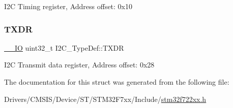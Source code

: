 I2C Timing register, Address offset\+: 0x10 \mbox{\label{struct_i2_c___type_def_ad243ba45c86b31cb271ccfc09c920628}} 
\subsubsection{\texorpdfstring{TXDR}{TXDR}}
{\footnotesize\ttfamily \mbox{\hyperlink{core__sc300_8h_aec43007d9998a0a0e01faede4133d6be}{\+\_\+\+\_\+\+IO}} uint32\+\_\+t I2\+C\+\_\+\+Type\+Def\+::\+T\+X\+DR}

I2C Transmit data register, Address offset\+: 0x28 

The documentation for this struct was generated from the following file\+:\begin{DoxyCompactItemize}
\item 
Drivers/\+C\+M\+S\+I\+S/\+Device/\+S\+T/\+S\+T\+M32\+F7xx/\+Include/\mbox{\hyperlink{stm32f722xx_8h}{stm32f722xx.\+h}}\end{DoxyCompactItemize}
